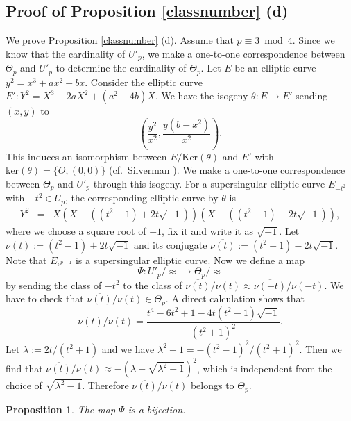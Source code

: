 \documentclass[a4paper, 11pt]{article}
\theoremstyle{plain}
\newtheorem{prop}[defn]{Proposition}
\newcommand{\?}{\textcolor{red}{??}}
\newcommand{\lm}{\lambda}
\begin{document}
\subsection{Proof of Proposition \ref{classnumber} (d)}
\label{kakkogonituite}
We prove Proposition \ref{classnumber} (d). Assume that $p \equiv 3 \bmod 4$. Since we know that the cardinality of ${U'}_p$, we make a one-to-one correspondence between ${\Theta}_p$ and $U'_p$ to determine the cardinality of ${\Theta}_p$. Let $E$ be an elliptic curve $y^2=x^3+ax^2+bx$. Consider the elliptic curve $E': Y^2=X^3-2aX^2+(a^2-4b)X$. We have the isogeny $\theta:E \longrightarrow E'$ sending $(x,y)$ to
\[
\left( \frac{y^2}{x^2}, \frac{y(b-x^2)}{x^2} \right).
\]
This induces an isomorphism between $E/{\textrm{Ker}(\theta)}$ and $E'$ with $\text{ker}(\theta)=\{ O, (0,0)\}$ (cf.\ Silverman \cite[Proposition 10.4.9]{AEC}). We make a one-to-one correspondence between ${\Theta}_p$ and $U'_p$ through this isogeny.
For a supersingular elliptic curve $E_{-t^2}$ with $-t^2 \in U_p$, the corresponding elliptic curve by $\theta$ is
\begin{eqnarray*}
    Y^2&=&X \left(X- \left( (t^2-1)+2t\sqrt{-1} \right) \right) \left(X- \left( (t^2-1)-2t\sqrt{-1} \right) \right),
\end{eqnarray*}
where we choose a square root of $-1$, fix it and write it as $\sqrt{-1}$. Let $\nu(t):=(t^2-1)+2t\sqrt{-1} $ and its conjugate $\overline{\nu(t)}:=(t^2-1)-2t\sqrt{-1}$. Note that $E_{{\nu}^{p-1}}$ is a supersingular elliptic curve. Now we define a map
   \[
   {\Psi}:U'_p/ \approx \longrightarrow {\Theta}_{p} / \approx
   \]
 by sending the class of $-t^2$ to the class of 
    $\overline{\nu(t)}/ \nu(t) \approx \overline{\nu(-t)}/ \nu(-t)$.
We have to check that $\overline{\nu(t)}/\nu(t) \in {\Theta}_p$.
A direct calculation shows that
\[
\overline{\nu(t)}/\nu(t) = \frac{t^4-6t^2+1-4t(t^2-1)\sqrt{-1}}{(t^2+1)^2}.
\]
Let $\lm :=2t/(t^2+1)$ and we have ${\lm}^2-1=-(t^2-1)^2/(t^2+1)^2$. Then we find that 
$\overline{\nu(t)}/ \nu(t) \approx-(\lm-\sqrt{{\lm}^2-1})^2$, which is independent from the choice of $\sqrt{{\lm}^2-1}$.
Therefore $\overline{\nu(t)}/\nu(t) $ belongs to ${\Theta}_p$.
\begin{prop}
    \label{thetaup}
    The map $\Psi$ is \textcolor{black}{a} bijection.
\end{prop}
\end{document}
